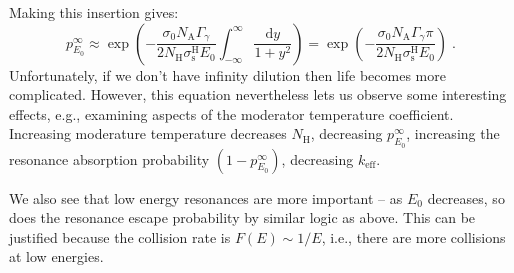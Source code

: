 Making this insertion gives:
\begin{equation*}
    p^\infty_{E_0} \approx \exp{\left(-\frac{\sigma_0N_\mathrm{A}\Gamma_\gamma}{2N_\mathrm{H}\sigma^\mathrm{H}_\mathrm{s}E_0}\int^{\infty}_{-\infty}\frac{\mathrm{d}y}{1+y^2}\right)} = \exp{\left(-\frac{\sigma_0N_\mathrm{A}\Gamma_\gamma \pi}{2N_\mathrm{H}\sigma^\mathrm{H}_\mathrm{s}E_0}\right)}\;\mathrm{.}
\end{equation*}
Unfortunately, if we don't have infinity dilution then life becomes more complicated. However, this equation nevertheless lets us observe some interesting effects, e.g., examining aspects of the moderator temperature coefficient. Increasing moderature temperature decreases $N_\mathrm{H}$, decreasing $p^\infty_{E_0}$, increasing the resonance absorption probability $(1-p^\infty_{E_0})$, decreasing $k_\mathrm{eff}$.

We also see that low energy resonances are more important -- as $E_0$ decreases, so does the resonance escape probability by similar logic as above. This can be justified because the collision rate is $F(E)\sim 1/E$, i.e., there are more collisions at low energies.